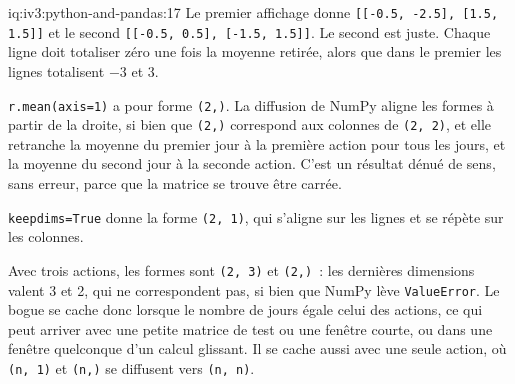 \begin{solution}{iq:iv3:python-and-pandas:17}
Le premier affichage donne \texttt{[[-0.5, -2.5], [1.5, 1.5]]} et le second \texttt{[[-0.5, 0.5], [-1.5, 1.5]]}. Le second est juste. Chaque ligne doit totaliser zéro une fois la moyenne retirée, alors que dans le premier les lignes totalisent $-3$ et $3$.

\texttt{r.mean(axis=1)} a pour forme \texttt{(2,)}. La diffusion de NumPy aligne les formes à partir de la droite, si bien que \texttt{(2,)} correspond aux colonnes de \texttt{(2, 2)}, et elle retranche la moyenne du premier jour à la première action pour tous les jours, et la moyenne du second jour à la seconde action. C'est un résultat dénué de sens, sans erreur, parce que la matrice se trouve être carrée.

\texttt{keepdims=True} donne la forme \texttt{(2, 1)}, qui s'aligne sur les lignes et se répète sur les colonnes.

Avec trois actions, les formes sont \texttt{(2, 3)} et \texttt{(2,)}~: les dernières dimensions valent 3 et 2, qui ne correspondent pas, si bien que NumPy lève \texttt{ValueError}. Le bogue se cache donc lorsque le nombre de jours égale celui des actions, ce qui peut arriver avec une petite matrice de test ou une fenêtre courte, ou dans une fenêtre quelconque d'un calcul glissant. Il se cache aussi avec une seule action, où \texttt{(n, 1)} et \texttt{(n,)} se diffusent vers \texttt{(n, n)}.

\end{solution}


